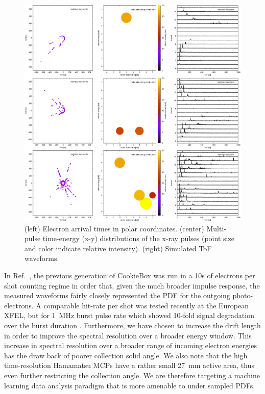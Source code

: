 \documentclass[aps]{revtex4}
\begin{document}
\begin{figure}
\centerline{\includegraphics[trim={-2cm -2cm 0 0},width=\figwidth]{plotting.ToFs.eps}}
\caption{\label{fig::ToFs}
	(left) Electron arrival times in polar coordinates.
	(center) Multi-pulse time-energy (x-y) distributions of the x-ray pulses (point size and color indicate relative intensity).
	(right) Simulated ToF waveforms.
}
\end{figure}

In Ref.~\cite{Nick2018}, the previous generation of CookieBox was run in a 10s of electrons per shot counting regime in order that, given the much broader impulse response, the measured waveforms fairly closely represented the PDF for the outgoing photo-electrons.
A comparable hit-rate per shot was tested recently at the European XFEL, but for 1~MHz burst pulse rate which showed 10-fold signal degradation over the burst duration \cite{MarkusUpdate2019}.
Furthermore, we have chosen to increase the drift length in order to improve the spectral resolution over a broader energy window.
This increase in spectral resolution over a broader range of incoming electron energies has the draw back of poorer collection solid angle.
We also note that the high time-resolution Hamamatsu MCPs have a rather small 27~mm active area, thus even further restricting the collection angle.
We are therefore targeting a machine learning data analysis paradigm that is more amenable to under sampled PDFs.
\end{document}
